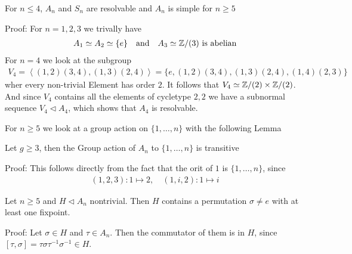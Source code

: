 \begin{theorem}[]
For $n \leq 4$, $A_n$ and $S_n$ are resolvable and $A_n$ is simple for $n \geq 5$
\end{theorem}
Proof: For $n = 1,2,3$ we trivally have
\begin{align*}
	A_1 \simeq A_2 \simeq \{e\} \quad \text{and} \quad A_3 \simeq \mathbb{Z}/(3) \text{ is abelian}
\end{align*}
For $n = 4$ we look at the subgroup 
\begin{align*}
	V_4 = \left<(1,2)(3,4),(1,3)(2,4)\right>	= \{e, (1,2)(3,4), (1,3)(2,4), (1,4)(2,3)\}
\end{align*}
wher every non-trivial Element has order $2$. It follows that $V_4 \simeq \mathbb{Z}/(2) \times \mathbb{Z}/(2)$. And since $V_4$ contains all the elements of cycletype $2,2$ we have a subnormal sequence $V_4 \lhd A_4$, which shows that $A_4$ is resolvable.

For $n \geq 5$ we look at a group action on $\{1, \ldots, n\}$ with the following Lemma
\begin{lemma}[]
Let $g \geq 3$, then the Group action of $A_n$ to $\{1, \ldots, n\}$ is transitive
\end{lemma}
Proof: This follows directly from the fact that the orit of $1$ is $\{1, \ldots, n\}$, since
\begin{align*}
	(1,2,3): 1 \mapsto 2, \quad (1,i,2): 1 \mapsto i	
\end{align*}

\begin{lemma}[]
	Let $n \geq 5$ and $H \lhd A_n$ nontrivial. Then $H$ contains a permutation $\sigma \neq e$ with at least one fixpoint.
\end{lemma}
Proof: Let $\sigma \in H$ and $\tau \in A_n$. Then the commutator of them is in $H$, since $[\tau,\sigma] = \tau \sigma \tau^{-1}\sigma^{-1} \in H$.

